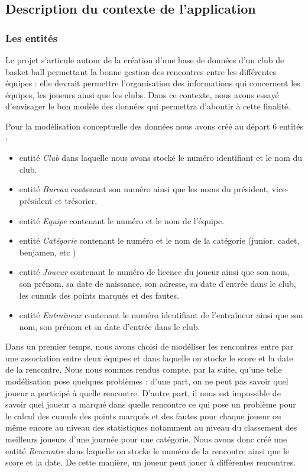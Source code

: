 \documentclass{article}
\begin{document}
\subsection{Description du contexte de l'application}

\subsubsection*{Les entités}
Le projet s’articule autour de la création d’une base de données d’un club de basket-ball permettant la bonne gestion des rencontres entre les différentes équipes : elle devrait permettre l’organisation des informations qui concernent les équipes, les joueurs ainsi que les clubs.
Dans ce contexte, nous avons essayé d’envisager le bon modèle des données qui permettra d’aboutir à cette finalité.

Pour la modélisation conceptuelle des données nous avons créé au départ 6 entités : \\


\begin{itemize}
\item entité \textit{Club} dans laquelle nous avons stocké le numéro identifiant et le nom du club.
\item entité \textit{Bureau} contenant son numéro ainsi que les noms du président, vice-président et trésorier. 
\item entité \textit{Equipe} contenant le numéro et le nom de l'équipe.
\item entité \textit{Catégorie} contenant le numéro et le nom de la catégorie (junior, cadet, benjamen, etc )
\item entité \textit{Joueur} contenant le numéro de licence du joueur ainsi que son nom, son prénom, sa date de naissance, son adresse, sa date d'entrée dans le club, les cumuls des points marqués et des fautes.
\item entité \textit{Entraîneur} contenant le numéro identifiant de l'entraîneur ainsi que son nom, son prénom et sa date d'entrée dans le club. \\
\end{itemize}



Dans un premier temps, nous avons choisi de modéliser les rencontres entre par une association entre deux équipes et dans laquelle on stocke le score et la date de la rencontre. Nous nous sommes rendus compte, par la suite, qu'une telle modélisation pose quelques problèmes : d'une part, on ne peut pas savoir quel joueur a participé à quelle rencontre. D'autre part, il nous est impossible de savoir quel joueur a marqué dans quelle rencontre ce qui pose un problème pour le calcul des cumuls des points marqués et des fautes pour chaque joueur ou même encore au niveau des statistiques notamment au niveau du classement des meilleurs joueurs d'une journée pour une catégorie. Nous avons donc créé une entité \textit{Rencontre} dans laquelle on stocke le numéro de la rencontre ainsi que le score et la date. De cette manière, un joueur peut jouer à différentes rencontres.
\\
\end{document}

